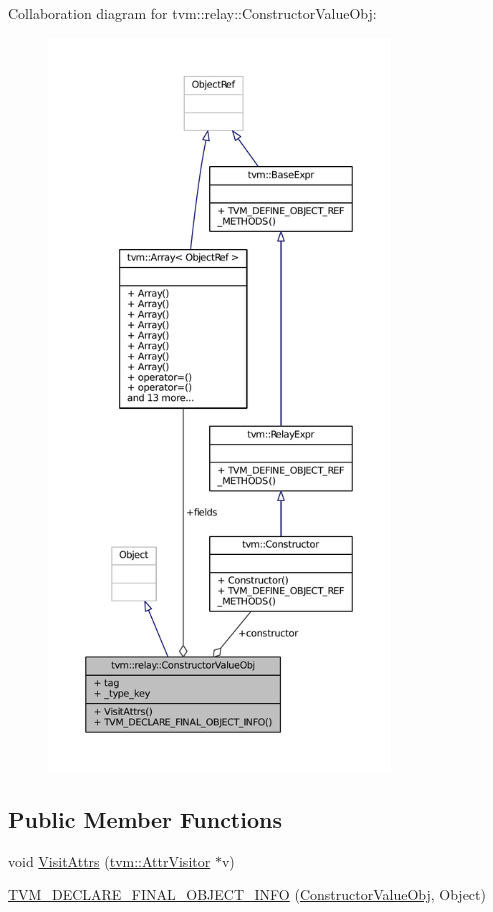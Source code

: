 Collaboration diagram for tvm\+:\+:relay\+:\+:Constructor\+Value\+Obj\+:
\nopagebreak
\begin{figure}[H]
\begin{center}
\leavevmode
\includegraphics[height=550pt]{structtvm_1_1relay_1_1ConstructorValueObj__coll__graph}
\end{center}
\end{figure}
\subsection*{Public Member Functions}
\begin{DoxyCompactItemize}
\item 
void \hyperlink{structtvm_1_1relay_1_1ConstructorValueObj_aa062bc1cf9c1ccdb3256b98b50899fe3}{Visit\+Attrs} (\hyperlink{classtvm_1_1AttrVisitor}{tvm\+::\+Attr\+Visitor} $\ast$v)
\item 
\hyperlink{structtvm_1_1relay_1_1ConstructorValueObj_a2daf1708bf360f151e100cd65e542610}{T\+V\+M\+\_\+\+D\+E\+C\+L\+A\+R\+E\+\_\+\+F\+I\+N\+A\+L\+\_\+\+O\+B\+J\+E\+C\+T\+\_\+\+I\+N\+FO} (\hyperlink{structtvm_1_1relay_1_1ConstructorValueObj}{Constructor\+Value\+Obj}, Object)
\end{DoxyCompactItemize}
